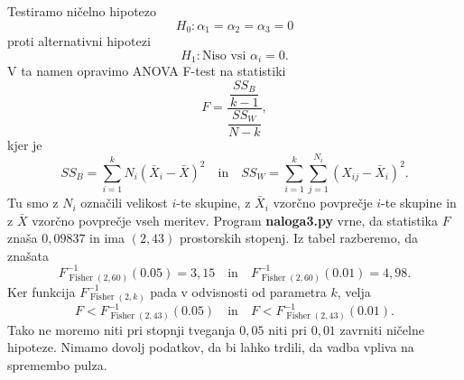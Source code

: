\documentclass[a4paper,11pt]{article}
\DeclareMathOperator{\Fisher}{Fisher}
\begin{document}
Testiramo ničelno hipotezo
\[H_0: \alpha_1 = \alpha_2 = \alpha_3 = 0\]
proti alternativni hipotezi
\[H_1: \text{Niso vsi } \alpha_i = 0.\]
V ta namen opravimo ANOVA F-test na statistiki
\[F = \frac{\dfrac{SS_B}{k-1}}{\dfrac{SS_W}{N-k}},\]
kjer je 
\[SS_B = \sum_{i=1}^k N_i(\bar{X}_i - \bar{X})^2 \quad \text{in} \quad SS_W = \sum_{i=1}^k \sum_{j=1}^{N_i}(X_{ij}-\bar{X}_i)^2.\]
Tu smo z $N_i$ označili velikost $i$-te skupine, z $\bar{X}_i$ vzorčno povprečje $i$-te skupine in z $\bar{X}$ vzorčno povprečje vseh meritev.
Program \textbf{naloga3.py} vrne, da statistika $F$ znaša $0,09837$ in ima $(2, 43)$ prostorskih stopenj.
Iz tabel razberemo, da znašata 
\[F^{-1}_{\Fisher(2, 60)}(0.05) = 3{,}15 \quad \text{in} \quad F^{-1}_{\Fisher(2, 60)}(0.01) = 4{,}98.\]
Ker funkcija $F^{-1}_{\Fisher(2, k)}$ pada v odvisnosti od parametra $k$, velja
\[F < F^{-1}_{\Fisher(2, 43)}(0.05) \quad \text{in} \quad F < F^{-1}_{\Fisher(2, 43)}(0.01).\]
Tako ne moremo niti pri stopnji tveganja $0{,}05$ niti pri $0{,}01$ zavrniti ničelne hipoteze.
Nimamo dovolj podatkov, da bi lahko trdili, da vadba vpliva na spremembo pulza.
\end{document}
